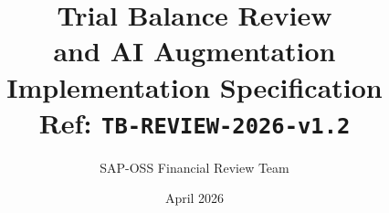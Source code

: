 \documentclass[11pt,a4paper,twoside]{report}
\begin{document}
\title{\vspace{-2em}\Large Trial Balance Review \\
       \textbf{and AI Augmentation} \\
       \large Implementation Specification \\
       \small Ref: \texttt{TB-REVIEW-2026-v1.2}}
\author{SAP-OSS Financial Review Team}
\date{April 2026}

\maketitle



















\end{document}
